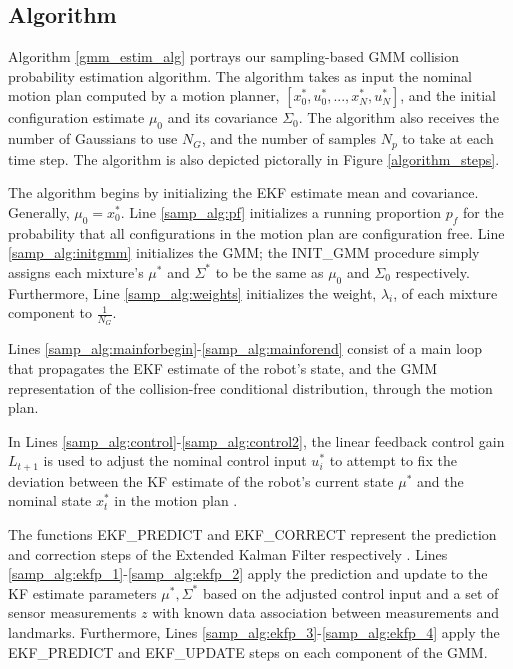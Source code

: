 \documentclass[journal]{IEEEtran}
\begin{document}
\subsection{Algorithm}

Algorithm \ref{gmm_estim_alg} portrays our sampling-based GMM collision probability estimation algorithm. The algorithm takes as input the nominal motion plan computed by a motion planner, $[x_0^*,u_0^*,...,x_N^*,u_N^*]$, and the initial configuration estimate $\mu_0$ and its covariance $\Sigma_0$. The algorithm also receives the number of Gaussians to use $N_G$, and the number of samples $N_p$ to take at each time step. The algorithm is also depicted pictorally in Figure \ref{algorithm_steps}.

The algorithm begins by initializing the EKF estimate mean and covariance. Generally, $\mu_0 = x_0^*$. Line \ref{samp_alg:pf} initializes a running proportion $p_f$ for the probability that all configurations in the motion plan are configuration free. Line \ref{samp_alg:initgmm} initializes the GMM; the INIT\_GMM procedure simply assigns each mixture's $\mu^*$ and $\Sigma^*$ to be the same as $\mu_0$ and $\Sigma_0$ respectively. Furthermore, Line \ref{samp_alg:weights} initializes the weight, $\lambda_i$, of each mixture component to $\frac{1}{N_G}$.

Lines \ref{samp_alg:mainforbegin}-\ref{samp_alg:mainforend} consist of a main loop that propagates the EKF estimate of the robot's state, and the GMM representation of the collision-free conditional distribution, through the motion plan.

In Lines \ref{samp_alg:control}-\ref{samp_alg:control2}, the linear feedback control gain $L_{t+1}$ is used to adjust the nominal control input $u_i^*$ to attempt to fix the deviation between the KF estimate of the robot's current state $\mu^*$ and the nominal state $x_t^*$ in the motion plan \cite{IEEEhowto:stengel}. 

The functions EKF\_PREDICT and EKF\_CORRECT represent the prediction and correction steps of the Extended Kalman Filter respectively \cite{IEEEhowto:thrun}. Lines \ref{samp_alg:ekfp_1}-\ref{samp_alg:ekfp_2} apply the prediction and update to the KF estimate parameters $\mu^*,\Sigma^*$ based on the adjusted control input and a set of sensor measurements $z$ with known data association between measurements and landmarks. Furthermore, Lines \ref{samp_alg:ekfp_3}-\ref{samp_alg:ekfp_4} apply the EKF\_PREDICT and EKF\_UPDATE steps on each component of the GMM.
\end{document}
